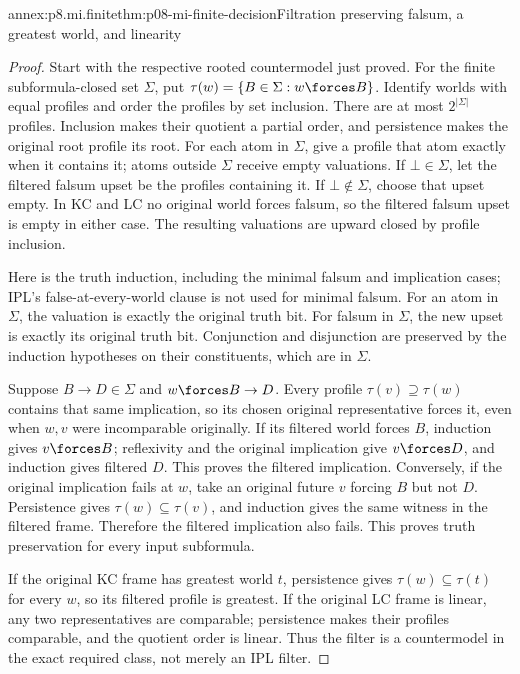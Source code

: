 \begin{annexitem}{annex:p8.mi.finite}{thm:p08-mi-finite-decision}{Filtration preserving falsum, a greatest world, and linearity}
\begin{proof}
Start with the respective rooted countermodel just proved. For the
finite subformula-closed set \(\Sigma\), put
\(\tau(w)=\{B\in\Sigma:w\forces B\}\). Identify worlds with
equal profiles and order the profiles by set inclusion. There are at
most \(2^{|\Sigma|}\) profiles. Inclusion makes their quotient a
partial order, and persistence makes the original root profile its root.
For each atom in \(\Sigma\), give a profile that atom exactly when
it contains it; atoms outside \(\Sigma\) receive empty valuations.
If \(\bot\in\Sigma\), let the filtered falsum upset be the
profiles containing it. If \(\bot\notin\Sigma\), choose that
upset empty. In KC and LC no original world forces falsum, so the
filtered falsum upset is empty in either case. The resulting valuations
are upward closed by profile inclusion.

Here is the truth induction, including the minimal falsum and implication
cases; IPL's false-at-every-world clause is not used for minimal falsum.
For an atom in \(\Sigma\), the valuation is exactly the original
truth bit. For falsum in \(\Sigma\), the new upset is exactly its
original truth bit. Conjunction and disjunction are preserved by the
induction hypotheses on their constituents, which are in \(\Sigma\).

Suppose \(B\to D\in\Sigma\) and \(w\forces B\to D\).
Every profile \(\tau(v)\supseteq\tau(w)\) contains that same
implication, so its chosen original representative forces it, even
when \(w,v\) were incomparable originally. If its filtered world
forces \(B\), induction gives \(v\forces B\); reflexivity and
the original implication give \(v\forces D\), and induction gives
filtered \(D\). This proves the filtered implication. Conversely,
if the original implication fails at \(w\), take an original future
\(v\) forcing \(B\) but not \(D\). Persistence gives
\(\tau(w)\subseteq\tau(v)\), and induction gives the same
witness in the filtered frame. Therefore the filtered implication
also fails. This proves truth preservation for every input subformula.

If the original KC frame has greatest world \(t\), persistence gives
\(\tau(w)\subseteq\tau(t)\) for every \(w\), so its filtered
profile is greatest. If the original LC frame is linear, any two
representatives are comparable; persistence makes their profiles
comparable, and the quotient order is linear. Thus the filter is a
countermodel in the exact required class, not merely an IPL filter.


\end{proof}
\end{annexitem}
